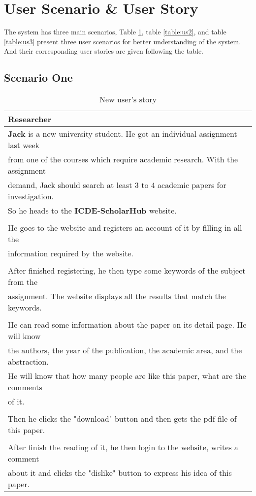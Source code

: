 \section{User Scenario \& User Story}

\noindent
The system has three main scenarios, 
Table \ref{table:us1}, table \ref{table:us2}, and table \ref{table:us3} present three user scenarios 
for better understanding of the system. And their corresponding user stories are given following the table.

\subsection*{Scenario One}

\begin{table}[!ht]
    \centering
	\begin{tabular}{ l }
		\hline
		\textbf{Researcher}                                  \\
		\hline
		\textbf{Jack} is a new university student. He got an individual assignment last week \\
        from one of the courses which require  academic research. With the assignment \\
        demand, Jack should search at least 3 to 4 academic papers for investigation.     \\
		So he heads to the \textbf{ICDE-ScholarHub} website.          \\
		\\
		He goes to the website and registers an account of it by filling in all the \\
        information required by the website.       \\
		\\
		After finished registering, he then type some keywords of the subject from the \\
        assignment. The website displays all the results that match the keywords.                          \\
		\\
		He can read some information about the paper on its detail page. He will know \\
        the authors, the year of the publication, the academic area, and the abstraction. \\
        He will know that how many people are like this paper, what are the comments    \\
		of it.                                                        \\
		\\
		Then he clicks the "download" button and then gets the pdf file of this paper. \\                                          
        \\
		After finish the reading of it, he then login to the website, writes a comment \\
        about it and clicks the "dislike" button to express his idea of this paper.                               \\
		\hline
	\end{tabular}
	\caption{New user's story}
	\label{table:us1}
\end{table}


